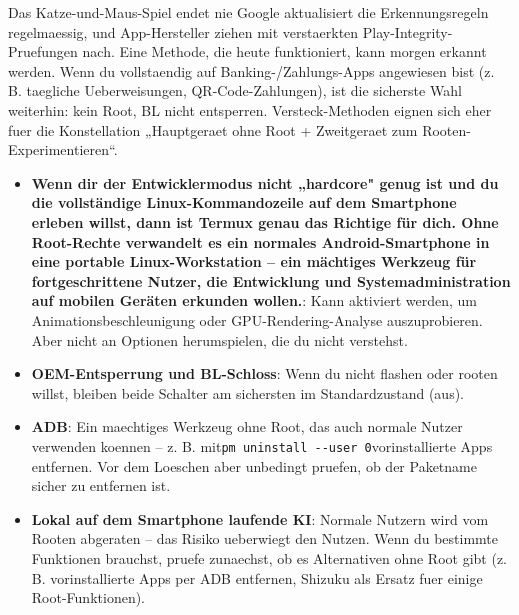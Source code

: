 \begin{tcbwarn}{Das Katze-und-Maus-Spiel endet nie}
Google aktualisiert die Erkennungsregeln regelmaessig, und App-Hersteller ziehen mit verstaerkten Play-Integrity-Pruefungen nach. Eine Methode, die heute funktioniert, kann morgen erkannt werden. Wenn du vollstaendig auf Banking-/Zahlungs-Apps angewiesen bist (z. B. taegliche Ueberweisungen, QR-Code-Zahlungen), ist die sicherste Wahl weiterhin: kein Root, BL nicht entsperren. Versteck-Methoden eignen sich eher fuer die Konstellation „Hauptgeraet ohne Root + Zweitgeraet zum Rooten-Experimentieren“.

\end{tcbwarn}


\begin{itemize}
  \item \textbf{Wenn dir der Entwicklermodus nicht „hardcore" genug ist und du die vollständige Linux-Kommandozeile auf dem Smartphone erleben willst, dann ist Termux genau das Richtige für dich. Ohne Root-Rechte verwandelt es ein normales Android-Smartphone in eine portable Linux-Workstation – ein mächtiges Werkzeug für fortgeschrittene Nutzer, die Entwicklung und Systemadministration auf mobilen Geräten erkunden wollen.}: Kann aktiviert werden, um Animationsbeschleunigung oder GPU-Rendering-Analyse auszuprobieren. Aber nicht an Optionen herumspielen, die du nicht verstehst.
  \item \textbf{OEM-Entsperrung und BL-Schloss}: Wenn du nicht flashen oder rooten willst, bleiben beide Schalter am sichersten im Standardzustand (aus).
  \item \textbf{ADB}: Ein maechtiges Werkzeug ohne Root, das auch normale Nutzer verwenden koennen – z. B. mit\texttt{pm uninstall -\allowbreak -\allowbreak user 0}vorinstallierte Apps entfernen. Vor dem Loeschen aber unbedingt pruefen, ob der Paketname sicher zu entfernen ist.
  \item \textbf{Lokal auf dem Smartphone laufende KI}: Normale Nutzern wird vom Rooten abgeraten – das Risiko ueberwiegt den Nutzen. Wenn du bestimmte Funktionen brauchst, pruefe zunaechst, ob es Alternativen ohne Root gibt (z. B. vorinstallierte Apps per ADB entfernen, Shizuku als Ersatz fuer einige Root-Funktionen).
\end{itemize}

